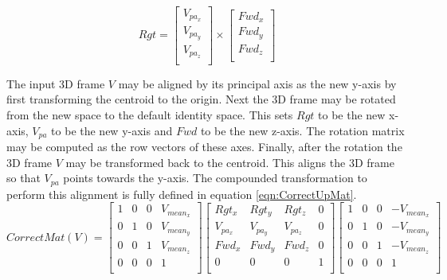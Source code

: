 \begin{equation} \label{eqn:rgtVector}
Rgt = \left[
\begin{array}{c}
V_{pa_{x}}\\
V_{pa_{y}}\\
V_{pa_{z}}\\
\end{array}
\right] \times \left[
\begin{array}{c}
Fwd_x\\
Fwd_y\\
Fwd_z\\
\end{array}
\right]
\end{equation}

The input 3D frame $V$ may be aligned by its principal axis as the new y-axis by first transforming the centroid to the origin. Next the 3D frame may be rotated from the new space to the default identity space. This sets $Rgt$ to be the new x-axis, $V_{pa}$ to be the new y-axis and $Fwd$ to be the new z-axis. The rotation matrix may be computed as the row vectors of these axes. Finally, after the rotation the 3D frame $V$ may be transformed back to the centroid. This aligns the 3D frame so that $V_{pa}$ points towards the y-axis. The compounded transformation to perform this alignment is fully defined in equation \ref{eqn:CorrectUpMat}. \\

\begin{equation} \label{eqn:CorrectUpMat}
CorrectMat(V) = \left[
\begin{array}{cccc}
1 & 0 & 0 & V_{mean_x} \\
0 & 1 & 0 & V_{mean_y} \\
0 & 0 & 1 & V_{mean_z} \\
0 & 0 & 0 & 1 \\
\end{array}
\right] \left[
\begin{array}{cccc}
Rgt_x & Rgt_y & Rgt_z & 0 \\
V_{pa_x} & V_{pa_y} & V_{pa_z} & 0 \\
Fwd_x & Fwd_y & Fwd_z & 0 \\
0 & 0 & 0 & 1 \\
\end{array}
\right] \left[
\begin{array}{cccc}
1 & 0 & 0 & -V_{mean_x} \\
0 & 1 & 0 & -V_{mean_y} \\
0 & 0 & 1 & -V_{mean_z} \\
0 & 0 & 0 & 1 \\
\end{array}
\right]
\end{equation}

